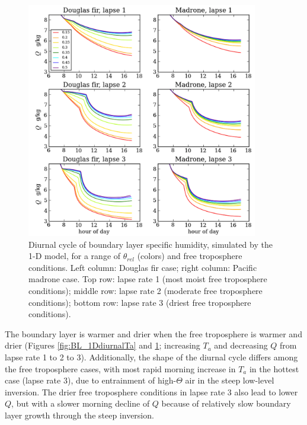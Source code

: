 \begin{figure}[here]
\includegraphics[width=0.9\textwidth]{ch2-BL/figures/testall_compare_sm_lapse_Q_cropped2.png}
\caption{Diurnal cycle of boundary layer specific humidity, simulated by the 1-D model, for a range of $\theta_{rel}$ (colors) and free troposphere conditions.  Left column: Douglas fir case; right column: Pacific madrone case.  Top row: lapse rate 1 (most moist free troposphere conditions); middle row: lapse rate 2 (moderate free troposphere conditions); bottom row: lapse rate 3 (driest free troposphere conditions).}
\label{fig:BL_1DdiurnalQ}
\end{figure}


The boundary layer is warmer and drier when the free troposphere is warmer and drier (Figures \ref{fig:BL_1DdiurnalTa} and \ref{fig:BL_1DdiurnalQ}; increasing $T_a$ and decreasing $Q$ from lapse rate 1 to 2 to 3).  Additionally, the shape of the diurnal cycle differs among the free troposphere cases, with most rapid morning increase in $T_a$ in the hottest case (lapse rate 3), due to entrainment of high-$\Theta$ air in the steep low-level inversion.  The drier free troposphere conditions in lapse rate 3 also lead to lower $Q$, but with a slower morning decline of $Q$ because of relatively slow boundary layer growth through the steep inversion.

